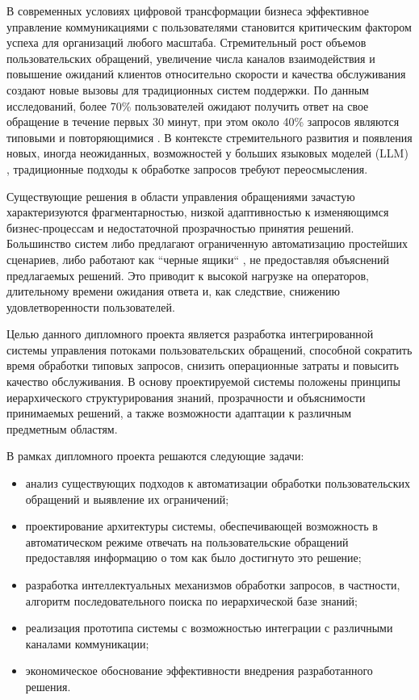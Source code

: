 
В современных условиях цифровой трансформации бизнеса эффективное управление коммуникациями с пользователями становится критическим фактором успеха для организаций любого масштаба. Стремительный рост объемов пользовательских обращений, увеличение числа каналов взаимодействия и повышение ожиданий клиентов относительно скорости и качества обслуживания создают новые вызовы для традиционных систем поддержки. По данным исследований, более 70\% пользователей ожидают получить ответ на свое обращение в течение первых 30 минут, при этом около 40\% запросов являются типовыми и повторяющимися \cite{gladlyReport}. В контексте стремительного развития и появления новых, иногда неожиданных, возможностей у больших языковых моделей (LLM) \cite{wei2022emergent}, традиционные подходы к обработке запросов требуют переосмысления.

Существующие решения в области управления обращениями зачастую характеризуются фрагментарностью, низкой адаптивностью к изменяющимся бизнес-процессам и недостаточной прозрачностью принятия решений. Большинство систем либо предлагают ограниченную автоматизацию простейших сценариев, либо работают как ``черные ящики`` \cite{blackBox}, не предоставляя объяснений предлагаемых решений. Это приводит к высокой нагрузке на операторов, длительному времени ожидания ответа и, как следствие, снижению удовлетворенности пользователей.

Целью данного дипломного проекта является разработка интегрированной системы управления потоками пользовательских обращений, способной  сократить время обработки типовых запросов, снизить операционные затраты и повысить качество обслуживания. В основу проектируемой системы положены принципы иерархического структурирования знаний, прозрачности и объяснимости принимаемых решений, а также возможности адаптации к различным предметным областям.

В рамках дипломного проекта решаются следующие задачи:

\begin{itemize}
\item анализ существующих подходов к автоматизации обработки пользовательских обращений и выявление их ограничений;
\item проектирование архитектуры системы, обеспечивающей возможность в автоматическом режиме отвечать на пользовательские обращений предоставляя информацию о том как было достигнуто это решение;
\item разработка интеллектуальных механизмов обработки запросов, в частности, алгоритм последовательного поиска по иерархической базе знаний;
\item реализация прототипа системы с возможностью интеграции с различными каналами коммуникации;
\item экономическое обоснование эффективности внедрения разработанного решения.
\end{itemize}

